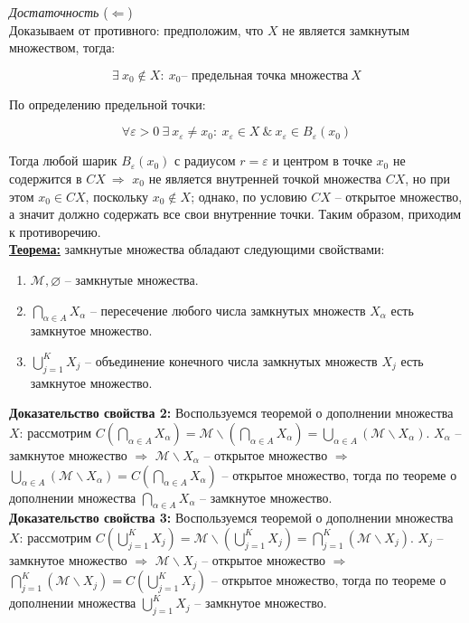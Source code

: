 \documentclass[a4paper,12pt]{article} %
\begin{document}
\textit{Достаточность} ($\Leftarrow$)\\

Доказываем от противного: предположим, что $X$ не является замкнутым множеством, тогда:

\[ \exists ~ x_0 \notin X : ~ x_0 \text{-- предельная точка множества} ~ X \]

По определению предельной точки:

\[ \forall \varepsilon > 0 ~ \exists ~ x_{\varepsilon} \neq x_0 : ~ x_{\varepsilon} \in X ~ \& ~ x_{\varepsilon} \in B_{\varepsilon}(x_0) \]

Тогда любой шарик $B_{\varepsilon}(x_0)$ с радиусом $r = \varepsilon$ и центром в точке $x_0$ не содержится в $CX ~ \Rightarrow$ $x_0$ не является внутренней точкой множества $CX$, но при этом $x_0 \in CX$, поскольку $x_0 \notin X$; однако, по условию $CX$ -- открытое множество, а значит должно содержать все свои внутренние точки. Таким образом, приходим к противоречию.\\

\underline{\textbf{Теорема:}} замкнутые множества обладают следующими свойствами:

\begin{enumerate}
    \item $\mathscr{M}, \varnothing$ -- замкнутые множества.
    \item $\bigcap \limits_{\alpha \in A} X_{\alpha}$ -- пересечение любого числа замкнутых множеств $X_{\alpha}$ есть замкнутое множество.
    \item $\bigcup \limits_{j = 1}^K X_j$ -- объединение конечного числа замкнутых множеств $X_j$ есть замкнутое множество.
\end{enumerate}

\textbf{Доказательство свойства 2:} Воспользуемся теоремой о дополнении множества $X$: рассмотрим $C(\bigcap \limits_{\alpha \in A} X_{\alpha}) = \mathscr{M} \backslash (\bigcap \limits_{\alpha \in A} X_{\alpha}) = \bigcup \limits_{\alpha \in A} (\mathscr{M} \backslash X_{\alpha})$. $X_{\alpha}$ -- замкнутое множество $\Rightarrow$ $\mathscr{M} \backslash X_{\alpha}$ -- открытое множество $\Rightarrow$ $\bigcup \limits_{\alpha \in A} (\mathscr{M} \backslash X_{\alpha}) = C(\bigcap \limits_{\alpha \in A} X_{\alpha})$ -- открытое множество, тогда по теореме о дополнении множества $\bigcap \limits_{\alpha \in A} X_{\alpha}$ -- замкнутое множество.\\

\textbf{Доказательство свойства 3:} Воспользуемся теоремой о дополнении множества $X$: рассмотрим $C(\bigcup \limits_{j = 1}^K X_j) = \mathscr{M} \backslash (\bigcup \limits_{j = 1}^K X_j) = \bigcap \limits_{j=1}^K (\mathscr{M} \backslash X_j)$. $X_j$ -- замкнутое множество $\Rightarrow$ $\mathscr{M} \backslash X_j$ -- открытое множество $\Rightarrow$ $\bigcap \limits_{j=1}^K (\mathscr{M} \backslash X_j) = C(\bigcup \limits_{j = 1}^K X_j)$ -- открытое множество, тогда по теореме о дополнении множества $\bigcup \limits_{j = 1}^K X_j$ -- замкнутое множество.\\
\end{document}
